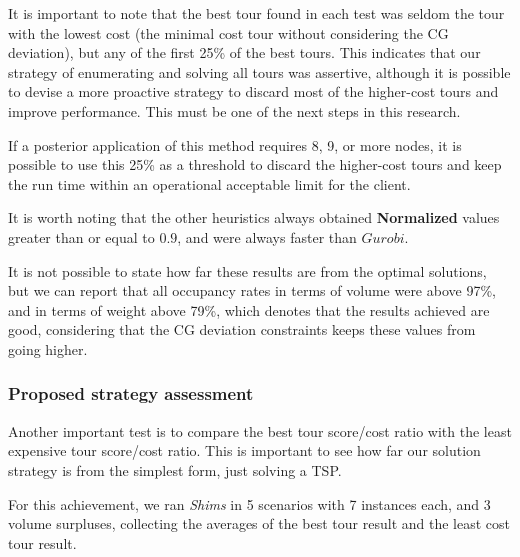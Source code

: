\documentclass[preprint]{elsarticle}
\begin{document}
It is important to note that the best tour found in each test was seldom the tour with the lowest cost (the minimal cost tour without considering the CG deviation), but any of the first 25\% of the best tours. This indicates that our strategy of enumerating and solving all tours was assertive, although it is possible to devise a more proactive strategy to discard most of the higher-cost tours and improve performance. This must be one of the next steps in this research.

If a posterior application of this method requires 8, 9, or more nodes, it is possible to use this 25\% as a threshold to discard the higher-cost tours and keep the run time within an operational acceptable limit for the client.


It is worth noting that the other heuristics always obtained {\bf Normalized}\/ values greater than or equal to $0.9$, and were always faster than $Gurobi$.

It is not possible to state how far these results are from the optimal solutions, but we can report that all occupancy rates in terms of volume were above 97\%, and in terms of weight above 79\%, which denotes that the results achieved are good, considering that the CG deviation constraints keeps these values from going higher.


\subsubsection{Proposed strategy assessment}

Another important test is to compare the best tour score/cost ratio with the least expensive tour score/cost ratio. This is important to see how far our solution strategy is from the simplest form, just solving a TSP.

For this achievement, we ran {\it Shims} in 5 scenarios with 7 instances each, and 3 volume surpluses, collecting the averages of the best tour result and the least cost tour result.
\end{document}
